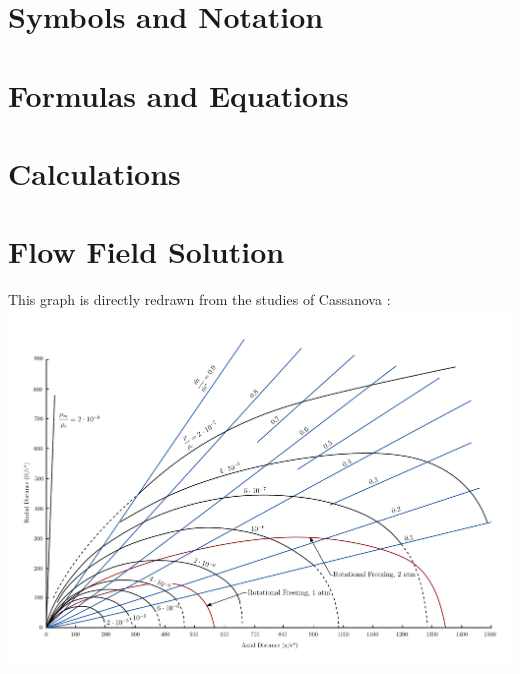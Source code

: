 \appendix

\section*{Symbols and Notation}

\newpage

\section*{Formulas and Equations}

\newpage

\listoffigures

\listoftables
\blankpage

\printbibliography
\blankpage

\section{Calculations}


\section{Flow Field Solution}
\label{apx:flow-field}
This graph is directly redrawn from the studies of Cassanova \cite{Cassanova1965}:\\
\includegraphics[angle=90, width=\textwidth]{src/03_analytical-work/fig_velocity-distribution.pdf}
\blankpage
